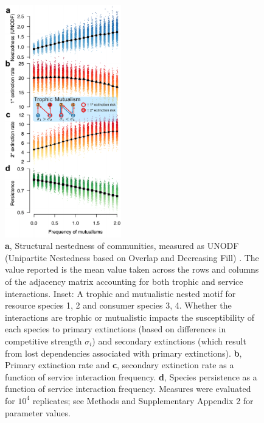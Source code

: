 \documentclass[twocolumn,preprintnumbers,amsmath,amssymb,superscriptaddress,linenumbers]{revtex4-1}
\begin{document}


\begin{figure}[h!]
\centering
\includegraphics[width=0.45\textwidth]{fig_nested3.pdf}
\vspace{0mm}
\caption{
\textbf{a}, Structural nestedness of communities, measured as UNODF (Unipartite Nestedness based on Overlap and Decreasing Fill) \cite{Cantor2017}.
The value reported is the mean value taken across the rows and columns of the adjacency matrix accounting for both trophic and service interactions.
Inset: A trophic and mutualistic nested motif for resource species 1, 2 and consumer species 3, 4.
Whether the interactions are trophic or mutualistic impacts the susceptibility of each species to primary extinctions (based on differences in competitive strength $\sigma_i$) and secondary extinctions (which result from lost dependencies associated with primary extinctions).
\textbf{b}, Primary extinction rate and \textbf{c}, secondary extinction rate as a function of service interaction frequency.
\textbf{d}, Species persistence as a function of service interaction frequency.
Measures were evaluated for $10^4$ replicates; see Methods and Supplementary Appendix 2 for parameter values.
\vspace{0mm}
}
\label{fig:nest}
\end{figure}
\end{document}

